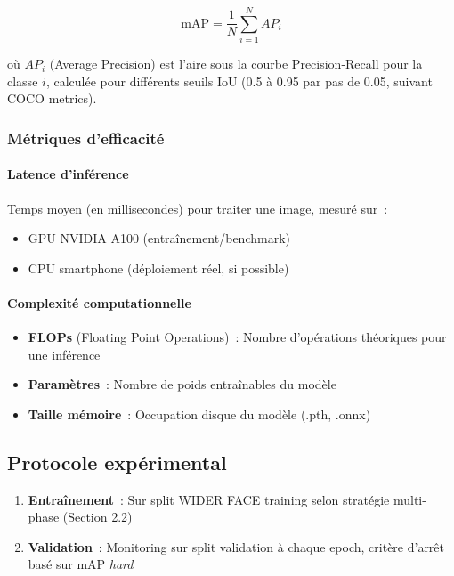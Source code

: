 \begin{onehalfspace}
\[
\text{mAP} = \frac{1}{N} \sum_{i=1}^{N} AP_i
\]

où $AP_i$ (Average Precision) est l'aire sous la courbe Precision-Recall pour la classe $i$, calculée pour différents seuils IoU (0.5 à 0.95 par pas de 0.05, suivant COCO metrics).

\subsubsection{Métriques d'efficacité}

\paragraph{Latence d'inférence}

\hspace{0.65 cm}Temps moyen (en millisecondes) pour traiter une image, mesuré sur~:
\begin{itemize}
\item GPU NVIDIA A100 (entraînement/benchmark)
\item CPU smartphone (déploiement réel, si possible)
\end{itemize}

\paragraph{Complexité computationnelle}

\begin{itemize}
\item \textbf{FLOPs} (Floating Point Operations)~: Nombre d'opérations théoriques pour une inférence
\item \textbf{Paramètres}~: Nombre de poids entraînables du modèle
\item \textbf{Taille mémoire}~: Occupation disque du modèle (.pth, .onnx)
\end{itemize}

\subsection{Protocole expérimental}

\begin{enumerate}
\item \textbf{Entraînement}~: Sur split WIDER FACE training selon stratégie multi-phase (Section 2.2)

\item \textbf{Validation}~: Monitoring sur split validation à chaque epoch, critère d'arrêt basé sur mAP \textit{hard}


\end{enumerate}
\end{onehalfspace}
